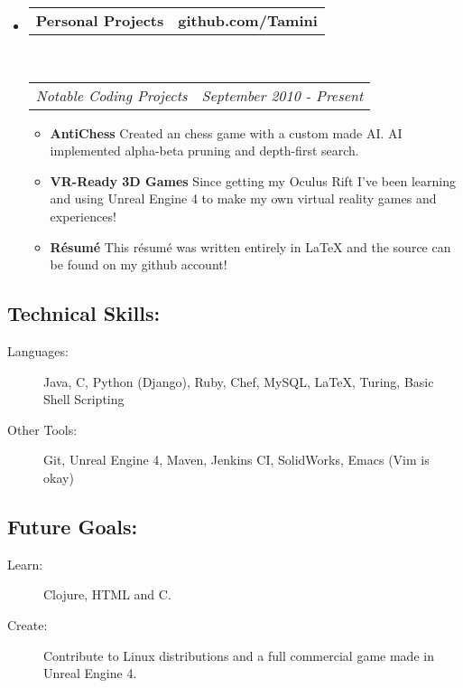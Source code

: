 \documentclass[11pt]{article} %
\makeatletter
\newcommand{\CPP}
{C\nolinebreak[4]\hspace{-.05em}\raisebox{.22ex}{\footnotesize\bf ++}}
\newcommand{\headerrow}[2]
{\begin{tabular*}{\linewidth}{l@{\extracolsep{\fill}}r}
	#1 &
	#2 \\
\end{tabular*}}
\makeatother
\begin{document}
\begin{itemize}
\begin{itemize}
	\end{itemize}
	\item
	\headerrow
		{\textbf{Personal Projects}}
		{\textbf{github.com/Tamini}}
	\\
	\headerrow
		{\emph{Notable Coding Projects}}
		{\emph{September 2010 - Present}}
	\begin{itemize}
		\item {\bf AntiChess} Created an chess game with a custom made AI. AI implemented alpha-beta pruning and depth-first search.
		\item {\bf VR-Ready 3D Games} Since getting my Oculus Rift I've been learning and using Unreal Engine 4 to make my own virtual reality games and experiences!
		\item {\bf R\'{e}sum\'{e}} This r\'{e}sum\'{e} was written entirely in LaTeX and the source can be found on my github account!
	\end{itemize}

\end{itemize}
\subsection*{Technical Skills:}
\begin{description}
	\item[Languages:] Java, \CPP, Python (Django), Ruby, Chef, MySQL, \LaTeX, Turing, Basic Shell Scripting
	\item[Other Tools:] Git, Unreal Engine 4, Maven, Jenkins CI, SolidWorks, Emacs (Vim is okay)
\end{description}
\subsection*{Future Goals:}
\begin{description}
	\item[Learn:] Clojure, HTML and C.
	\item[Create:] Contribute to Linux distributions and a full commercial game made in Unreal Engine 4.
\end{description}
\end{document}
